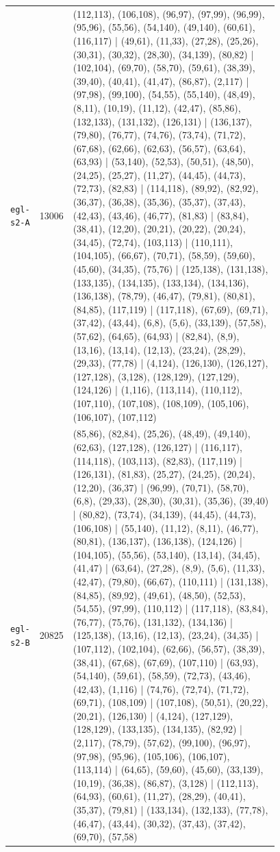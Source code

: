 \begin{landscape}
\begin{longtable}{lr>{\tiny\raggedright\arraybackslash}p{0.78\linewidth}}
\texttt{egl-s2-A} & 13006 & (112,113), (106,108), (96,97), (97,99), (96,99), (95,96), (55,56), (54,140), (49,140), (60,61), (116,117) | (49,61), (11,33), (27,28), (25,26), (30,31), (30,32), (28,30), (34,139), (80,82) | (102,104), (69,70), (58,70), (59,61), (38,39), (39,40), (40,41), (41,47), (86,87), (2,117) | (97,98), (99,100), (54,55), (55,140), (48,49), (8,11), (10,19), (11,12), (42,47), (85,86), (132,133), (131,132), (126,131) | (136,137), (79,80), (76,77), (74,76), (73,74), (71,72), (67,68), (62,66), (62,63), (56,57), (63,64), (63,93) | (53,140), (52,53), (50,51), (48,50), (24,25), (25,27), (11,27), (44,45), (44,73), (72,73), (82,83) | (114,118), (89,92), (82,92), (36,37), (36,38), (35,36), (35,37), (37,43), (42,43), (43,46), (46,77), (81,83) | (83,84), (38,41), (12,20), (20,21), (20,22), (20,24), (34,45), (72,74), (103,113) | (110,111), (104,105), (66,67), (70,71), (58,59), (59,60), (45,60), (34,35), (75,76) | (125,138), (131,138), (133,135), (134,135), (133,134), (134,136), (136,138), (78,79), (46,47), (79,81), (80,81), (84,85), (117,119) | (117,118), (67,69), (69,71), (37,42), (43,44), (6,8), (5,6), (33,139), (57,58), (57,62), (64,65), (64,93) | (82,84), (8,9), (13,16), (13,14), (12,13), (23,24), (28,29), (29,33), (77,78) | (4,124), (126,130), (126,127), (127,128), (3,128), (128,129), (127,129), (124,126) | (1,116), (113,114), (110,112), (107,110), (107,108), (108,109), (105,106), (106,107), (107,112) \\[2pt]
\texttt{egl-s2-B} & 20825 & (85,86), (82,84), (25,26), (48,49), (49,140), (62,63), (127,128), (126,127) | (116,117), (114,118), (103,113), (82,83), (117,119) | (126,131), (81,83), (25,27), (24,25), (20,24), (12,20), (36,37) | (96,99), (70,71), (58,70), (6,8), (29,33), (28,30), (30,31), (35,36), (39,40) | (80,82), (73,74), (34,139), (44,45), (44,73), (106,108) | (55,140), (11,12), (8,11), (46,77), (80,81), (136,137), (136,138), (124,126) | (104,105), (55,56), (53,140), (13,14), (34,45), (41,47) | (63,64), (27,28), (8,9), (5,6), (11,33), (42,47), (79,80), (66,67), (110,111) | (131,138), (84,85), (89,92), (49,61), (48,50), (52,53), (54,55), (97,99), (110,112) | (117,118), (83,84), (76,77), (75,76), (131,132), (134,136) | (125,138), (13,16), (12,13), (23,24), (34,35) | (107,112), (102,104), (62,66), (56,57), (38,39), (38,41), (67,68), (67,69), (107,110) | (63,93), (54,140), (59,61), (58,59), (72,73), (43,46), (42,43), (1,116) | (74,76), (72,74), (71,72), (69,71), (108,109) | (107,108), (50,51), (20,22), (20,21), (126,130) | (4,124), (127,129), (128,129), (133,135), (134,135), (82,92) | (2,117), (78,79), (57,62), (99,100), (96,97), (97,98), (95,96), (105,106), (106,107), (113,114) | (64,65), (59,60), (45,60), (33,139), (10,19), (36,38), (86,87), (3,128) | (112,113), (64,93), (60,61), (11,27), (28,29), (40,41), (35,37), (79,81) | (133,134), (132,133), (77,78), (46,47), (43,44), (30,32), (37,43), (37,42), (69,70), (57,58) \\[2pt]

\end{longtable}
\end{landscape}
